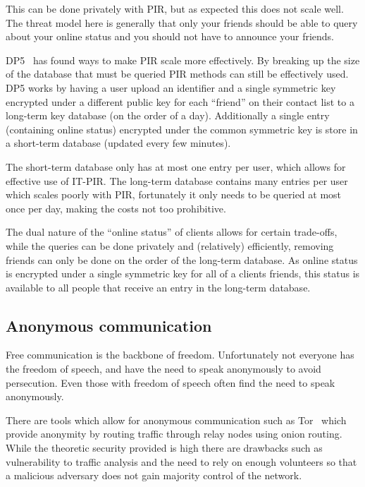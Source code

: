 This can be done privately with PIR, but as expected this does not scale well.
The threat model here is generally that only your friends should be able to
query about your online status and you should not have to announce your friends.

DP5~\cite{borisov2015dp5} has found ways to make PIR scale more effectively. By
breaking up the size of the database that must be queried PIR methods can still
be effectively used. DP5 works by having a user upload an identifier and a
single symmetric key encrypted under a different public key for each ``friend''
on their contact list to a long-term key database (on the order of a day).
Additionally a single entry (containing online status) encrypted under the
common symmetric key is store in a short-term database (updated every few
minutes). 

The short-term database only has at most one entry per user, which allows for
effective use of IT-PIR. The long-term database contains many entries per user
which scales poorly with PIR, fortunately it only needs to be queried at most
once per day, making the costs not too prohibitive. 

The dual nature of the ``online status'' of clients allows for certain
trade-offs, while the queries can be done privately and (relatively)
efficiently, removing friends can only be done on the order of the long-term
database. As online status is encrypted under a single symmetric key for all of
a clients friends, this status is available to all people that receive an entry
in the long-term database.

\subsection{Anonymous communication}\label{sec:anonymousCommunication}
Free communication is the backbone of freedom. Unfortunately not everyone has
the freedom of speech, and have the need to speak anonymously to avoid
persecution. Even those with freedom of speech often find the need to speak
anonymously.

There are tools which allow for anonymous communication such as
Tor~\cite{syverson2004tor} which provide anonymity by routing traffic through
relay nodes using onion routing. While the theoretic security provided is high
there are drawbacks such as vulnerability to traffic analysis and the need to
rely on enough volunteers so that a malicious adversary does not gain majority
control of the network. 